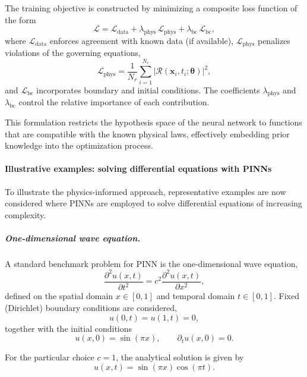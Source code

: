 The training objective is constructed by minimizing a composite loss function of the form
\begin{equation}
    \mathcal{L} = \mathcal{L}_{\mathrm{data}} + \lambda_{\mathrm{phys}} \, \mathcal{L}_{\mathrm{phys}} + \lambda_{\mathrm{bc}} \, \mathcal{L}_{\mathrm{bc}},
\end{equation}
where $\mathcal{L}_{\mathrm{data}}$ enforces agreement with known data (if available), $\mathcal{L}_{\mathrm{phys}}$ penalizes violations of the governing equations,
\begin{equation}
    \mathcal{L}_{\mathrm{phys}} = \frac{1}{N_r} \sum_{i=1}^{N_r} \left| \mathcal{R}(\mathbf{x}_i, t_i; \boldsymbol{\theta}) \right|^2,
\end{equation}
and $\mathcal{L}_{\mathrm{bc}}$ incorporates boundary and initial conditions. The coefficients $\lambda_{\mathrm{phys}}$ and $\lambda_{\mathrm{bc}}$ control the relative importance of each contribution.

This formulation restricts the hypothesis space of the neural network to functions that are compatible with the known physical laws, effectively embedding prior knowledge into the optimization process.

\paragraph{Illustrative examples: solving differential equations with PINNs}
To illustrate the physics-informed approach, representative examples are now considered where PINNs are employed to solve differential equations of increasing complexity.

\subparagraph{One-dimensional wave equation.}
A standard benchmark problem for PINN is the one-dimensional wave equation,
\begin{equation}
    \frac{\partial^2 u(x,t)}{\partial t^2} = c^2 \frac{\partial^2 u(x,t)}{\partial x^2},
\end{equation}
defined on the spatial domain $x \in [0,1]$ and temporal domain $t \in [0,1]$. 
Fixed (Dirichlet) boundary conditions are considered,
\begin{equation}
    u(0,t) = u(1,t) = 0,
\end{equation}
together with the initial conditions
\begin{equation}
    u(x,0) = \sin(\pi x), 
    \qquad 
    \partial_t u(x,0) = 0.
\end{equation}

For the particular choice $c=1$, the analytical solution is given by
\begin{equation}
    u(x,t) = \sin(\pi x)\cos(\pi t).
\end{equation}

